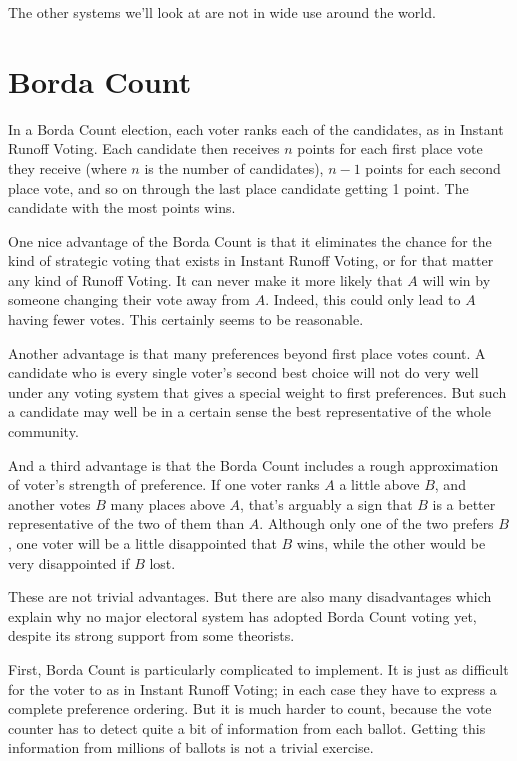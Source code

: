 \begin{multicols}{2}
The other systems we'll look at are not in wide use around the world.


\section{Borda Count}
In a Borda Count election, each voter ranks each of the candidates, as in Instant Runoff Voting. Each candidate then receives $n$ points for each first place vote they receive (where $n$ is the number of candidates), $n-1$ points for each second place vote, and so on through the last place candidate getting 1 point. The candidate with the most points wins.

One nice advantage of the Borda Count is that it eliminates the chance for the kind of strategic voting that exists in Instant Runoff Voting, or for that matter any kind of Runoff Voting. It can never make it more likely that $A$ will win by someone changing their vote away from $A$. Indeed, this could only lead to $A$ having fewer votes. This certainly seems to be reasonable.

Another advantage is that many preferences beyond first place votes count. A candidate who is every single voter's second best choice will not do very well under any voting system that gives a special weight to first preferences. But such a candidate may well be in a certain sense the best representative of the whole community.

And a third advantage is that the Borda Count includes a rough approximation of voter's strength of preference. If one voter ranks $A$ a little above $B$, and another votes $B$ many places above $A$, that's arguably a sign that $B$ is a better representative of the two of them than $A$. Although only one of the two prefers $B$, one voter will be a little disappointed that $B$ wins, while the other would be very disappointed if $B$ lost.

These are not trivial advantages. But there are also many disadvantages which explain why no major electoral system has adopted Borda Count voting yet, despite its strong support from some theorists.

First, Borda Count is particularly complicated to implement. It is just as difficult for the voter to as in Instant Runoff Voting; in each case they have to express a complete preference ordering. But it is much harder to count, because the vote counter has to detect quite a bit of information from each ballot. Getting this information from millions of ballots is not a trivial exercise.


\end{multicols}
